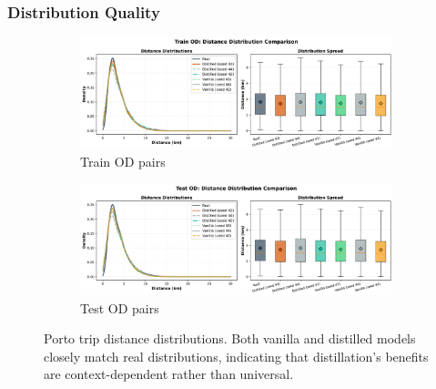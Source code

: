 \subsubsection{Distribution Quality}

\begin{figure}[t]
    \centering
    \begin{subfigure}{0.49\linewidth}
        \centering
        \includegraphics[width=\linewidth]{assets/plots/eval/porto/distributions/distance_distribution_train_od.pdf}
        \caption{Train OD pairs}
    \end{subfigure}
    \begin{subfigure}{0.49\linewidth}
        \centering
        \includegraphics[width=\linewidth]{assets/plots/eval/porto/distributions/distance_distribution_test_od.pdf}
        \caption{Test OD pairs}
    \end{subfigure}
    \caption{Porto trip distance distributions. Both vanilla and distilled models closely match real distributions, indicating that distillation's benefits are context-dependent rather than universal.}
    \label{fig:porto-distance-distributions}
\end{figure}

